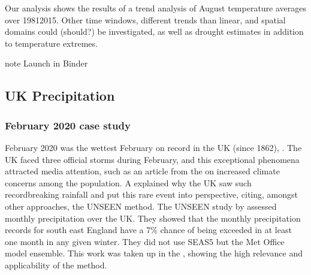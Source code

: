 \documentclass[letterpaper,10pt,english]{sphinxmanual}
\begin{document}

Our analysis shows the results of a  trend analysis of August temperature averages over 1981\sphinxhyphen{}2015. Other time windows, different trends than linear, and spatial domains could (should?) be investigated, as well as drought estimates in addition to temperature extremes.

\begin{sphinxadmonition}{note}{}\unskip
Launch in Binder 


\end{sphinxadmonition}


\subsection{UK Precipitation}
\label{\detokenize{Notebooks/examples/UK_Precipitation:UK-Precipitation}}\label{\detokenize{Notebooks/examples/UK_Precipitation::doc}}

\subsubsection{February 2020 case study}
\label{\detokenize{Notebooks/examples/UK_Precipitation:February-2020-case-study}}
February 2020 was the wettest February on record in the UK (since 1862), . The UK faced three official storms during February, and this exceptional phenomena attracted media attention, such as an article from the  on increased climate concerns among the population. A  explained why the UK saw such record\sphinxhyphen{}breaking rainfall and put this rare event into perspective, citing, amongst other approaches, the UNSEEN method. The UNSEEN study by  assessed monthly precipitation over the UK. They showed that the monthly precipitation records for south east England have a 7\% chance of being
exceeded in at least one month in any given winter. They did not use SEAS5 but the Met Office model ensemble. This work was taken up in the , showing the high relevance and applicability of the method.
\end{document}
